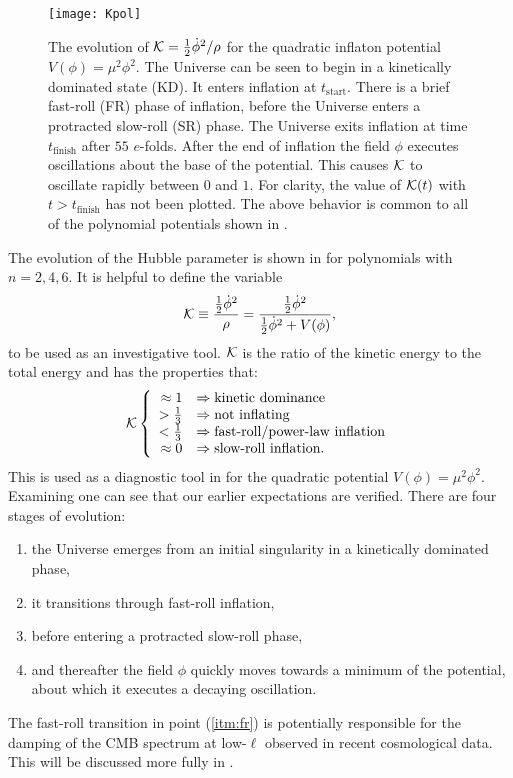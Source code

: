 %
\begin{figure}
  \texttt{[image: Kpol]} 
  \caption{The evolution of $\mathcal{K} = \frac{1}{2}\dot{\phi}^2/\rho$
  for the quadratic inflaton potential $V(\phi) = \mu^2 \phi^2$.  The
  Universe can be seen to begin in a kinetically dominated state (KD).
  It enters inflation at $t_\mathrm{start}$. There is a brief
  fast-roll (FR) phase of inflation, before the Universe enters a
  protracted slow-roll (SR) phase. The Universe exits inflation at
  time $t_\mathrm{finish}$ after $55$ $e$-folds. After the end of
  inflation the field $\phi$ executes oscillations about the base of
  the potential. This causes $\mathcal{K}$ to oscillate rapidly between $0$
  and $1$. For clarity, the value of $\mathcal{K}(t)$ with
  $t>t_\mathrm{finish}$ has not been plotted. The above behavior is
  common to all of the  polynomial potentials shown in
  \protect{}.  }
    \label{fig:figure_Kpol}
\end{figure}
%

The evolution of the Hubble parameter is shown in
 for polynomials with $n=2,4,6$. It is helpful
to define the variable
%
\begin{equation}
  \mathcal{K} 
  \equiv  
  \frac{\frac{1}{2}\dot{\phi}^2  }{\rho}  
  =  
  \frac{\frac{1}{2}\dot{\phi}^2  }
  {\frac{1}{2}\dot{\phi}^2 + V(\phi)},
\end{equation}
%
to be used as an investigative tool. $\mathcal{K}$ is the ratio of the
kinetic energy to the total energy and has the properties that:
%
\begin{equation}
  \Kfrac 
    \left\{
    \begin{array}{rl}
      \approx 1 &\Rightarrow \hbox{kinetic dominance} 
      \\
      >\frac{1}{3} &\Rightarrow \hbox{not inflating}
      \\
      <\frac{1}{3} &\Rightarrow \hbox{fast-roll/power-law inflation}
      \\
      \approx 0 &\Rightarrow \hbox{slow-roll inflation.}
    \end{array}
%
    \right.
\end{equation}
%
This is used as a diagnostic tool in  for the
quadratic potential $V(\phi) = \mu^2\phi^2$. Examining
 one can see that our earlier expectations are
verified. There are four stages of evolution:
%
\begin{enumerate}
  \item the Universe emerges from an initial singularity in a
    kinetically dominated phase,
  \item it transitions through fast-roll inflation, \label{itm:fr}
  \item before entering a protracted slow-roll phase, 
  \item and thereafter the field $\phi$ quickly moves towards a
    minimum of the potential, about which it executes a decaying
    oscillation.
\end{enumerate}
%
The fast-roll transition in point (\ref{itm:fr}) is potentially
responsible for the damping of the CMB spectrum at low-$\ell$ observed
in recent cosmological data. This will be discussed more fully in
.



